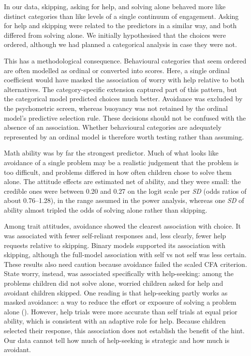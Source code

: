 \documentclass[
  man,
  floatsintext,
  longtable,
  nolmodern,
  notxfonts,
  notimes,
  colorlinks=true,linkcolor=blue,citecolor=blue,urlcolor=blue]{apa7}
\begin{document}
In our data, skipping, asking for help, and solving alone behaved more
like distinct categories than like levels of a single continuum of
engagement. Asking for help and skipping were related to the predictors
in a similar way, and both differed from solving alone. We initially
hypothesised that the choices were ordered, although we had planned a
categorical analysis in case they were not.

This has a methodological consequence. Behavioural categories that seem
ordered are often modelled as ordinal or converted into scores. Here, a
single ordinal coefficient would have masked the association of worry
with help relative to both alternatives. The category-specific extension
captured part of this pattern, but the categorical model predicted
choices much better. Avoidance was excluded by the psychometric screen,
whereas buoyancy was not retained by the ordinal model's predictive
selection rule. These decisions should not be confused with the absence
of an association. Whether behavioural categories are adequately
represented by an ordinal model is therefore worth testing rather than
assuming.

Math ability was by far the strongest predictor. Much of what looks like
avoidance of a single problem may be a realistic judgement that the
problem is too difficult, and problems differed in how often children
chose to solve them alone. The attitude effects are estimated net of
ability, and they were small: the credible ones were between 0.20 and
0.27 on the logit scale per \emph{SD} (odds ratios of about 0.76--1.28),
in the range assumed in the power analysis, whereas one \emph{SD} of
ability almost tripled the odds of solving alone rather than skipping.

Among trait attitudes, avoidance showed the clearest association with
choice. It was associated with fewer self-reliant responses and, less
clearly, fewer help requests relative to skipping. Binary models
supported its association with skipping, although the full-model
association with self vs not self was less certain. These results also
need caution because avoidance failed the scaled CFA criterion. State
worry, instead, was associated specifically with help-seeking: among the
problems children did not solve alone, worried children asked for help
and avoidant children skipped. One reading is that help-seeking partly
works as masked avoidance: a way to reduce the effort or exposure of
solving a problem alone ().
However, help trials were more accurate than self trials at equal prior
ability, which is consistent with an adaptive role for help. Because
children selected their response, this association does not establish
the benefit of the hint. Our data cannot tell how much of help-seeking
is strategic and how much is avoidant.
\end{document}
